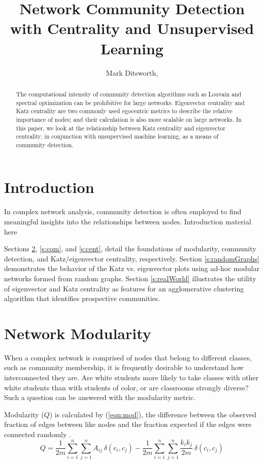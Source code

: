 \documentclass{IEEEtran}
\title{Network Community Detection with Centrality and Unsupervised Learning}
\author{Mark Ditsworth, \textellipsis}
\begin{document}
	\maketitle
	\begin{abstract}
	The computational intensity of community detection algorithms such as Louvain and spectral optimization can be prohibitive for large networks.
	Eigenvector centrality and Katz centrality are two commonly used egocentric metrics to describe the relative importance of nodes; and their calculation is also more scalable on large networks.
	In this paper, we look at the relationship between Katz centrality and eigenvector centrality, in conjunction with unsupervised machine learning, as a means of community detection.
	\end{abstract}
	
	\section{Introduction}
	In complex network analysis, community detection is often employed to find meaningful insights into the relationships between nodes.
	Introduction material here \textellipsis
	
	Sections \ref{s:mod}, \ref{s:com}, and \ref{s:cent}, detail the foundations of modularity, community detection, and Katz/eigenvector centrality, respectively. Section \ref{s:randomGraphs} demonstrates the behavior of the Katz vs. eigenvector plots using ad-hoc modular networks formed from random graphs. Section \ref{s:realWorld} illustrates the utility of eigenvector and Katz centrality as features for an agglomerative clustering algorithm  that identifies prospective communities.
	 
	\section{Network Modularity}
	\label{s:mod}
	When a complex network is comprised of nodes that belong to different classes, such as community membership, it is frequently desirable to understand how interconnected they are. Are white students more likely to take classes with other white students than with students of color, or are classrooms strongly diverse? Such a question can be answered with the modularity metric.
	
	Modularity ($Q$) is calculated by (\ref{eqn:mod}), the difference between the observed fraction of edges between like nodes and the fraction expected if the edges were connected randomly \cite{Mod}.
	\begin{equation}
	\label{eqn:mod}
	Q = \frac{1}{2m}\sum_{i=1}^{n}\sum_{j=1}^{n}A_{ij}~\delta(c_i,c_j) - \frac{1}{2m}\sum_{i=1}^{n}\sum_{j=1}^{n}\frac{k_ik_j}{2m}~\delta(c_i,c_j)
	\end{equation}
	
\end{document}
